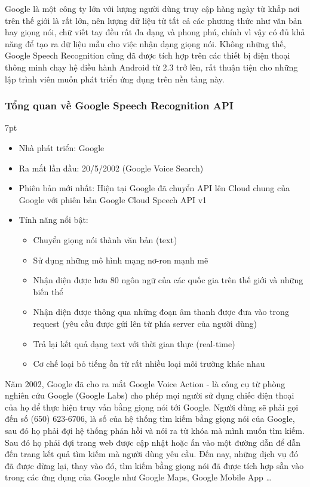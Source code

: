 \documentclass[12pt]{report}
\newenvironment{formal}{%
  \def\FrameCommand{%
    \hspace{1pt}%
    {\color{mygray}\vrule width 6pt}%
    {\color{lightgray}\vrule width 4pt}%
    \colorbox{lightgray}%
  }%
  \MakeFramed{\advance\hsize-\width\FrameRestore}%
  \noindent\hspace{-4.55pt}%
  \begin{adjustwidth}{}{7pt}%
  \vspace{2pt}\vspace{2pt}%
}
{%
  \vspace{2pt}\end{adjustwidth}\endMakeFramed%
}
\begin{document}
Google là một công ty lớn với lượng người dùng truy cập hàng ngày từ khắp nơi trên thế giới là rất lớn, nên lượng dữ liệu từ tất cả các phương thức như văn bản hay giọng nói, chữ viết tay đều rất đa dạng và phong phú, chính vì vậy có đủ khả năng để tạo ra dữ liệu mẫu cho việc nhận dạng giọng nói. Không những thế, Google Speech Recognition cũng đã được tích hợp trên các thiết bị điện thoại thông minh chạy hệ điều hành Android từ 2.3 trở lên, rất thuận tiện cho những lập trình viên muốn phát triển ứng dụng trên nền tảng này.

\subsubsection{Tổng quan về Google Speech Recognition API}
\begin{formal}
	\begin{itemize}
		\item Nhà phát triển: Google
		\item Ra mắt lần đầu: 20/5/2002 (Google Voice Search)
		\item Phiên bản mới nhất: Hiện tại Google đã chuyển API lên Cloud chung của Google với phiên bản Google Cloud Speech API v1
		\item Tính năng nổi bật:
		\begin{itemize}
			\item Chuyển giọng nói thành văn bản (text)
			\item Sử dụng những mô hình mạng nơ-ron mạnh mẽ
			\item Nhận diện được hơn 80 ngôn ngữ của các quốc gia trên thế giới và những biến thể
			\item Nhận diện được thông qua những đoạn âm thanh được đưa vào trong request (yêu cầu được gửi lên từ phía server của người dùng)
			\item Trả lại kết quả dạng text với thời gian thực (real-time)
			\item Cơ chế loại bỏ tiếng ồn từ rất nhiều loại môi trường khác nhau
		\end{itemize}
	\end{itemize}
\end{formal}

Năm 2002, Google đã cho ra mắt Google Voice Action - là công cụ từ phòng nghiên cứu Google (Google Labs) cho phép mọi người sử dụng chiếc điện thoại của họ để thực hiện truy vấn bằng giọng nói tới Google. Người dùng sẽ phải gọi đến số (650) 623-6706, là số của hệ thống tìm kiếm bằng giọng nói của Google, sau đó họ phải đợi hệ thống phản hồi và nói ra từ khóa mà mình muốn tìm kiếm. Sau đó họ phải đợi trang web được cập nhật hoặc ấn vào một đường dẫn để dẫn đến trang kết quả tìm kiếm mà người dùng yêu cầu. Đến nay, những dịch vụ đó đã được dừng lại, thay vào đó, tìm kiếm bằng giọng nói đã được tích hợp sẵn vào trong các ứng dụng của Google như Google Maps, Google Mobile App \ldots
\end{document}
